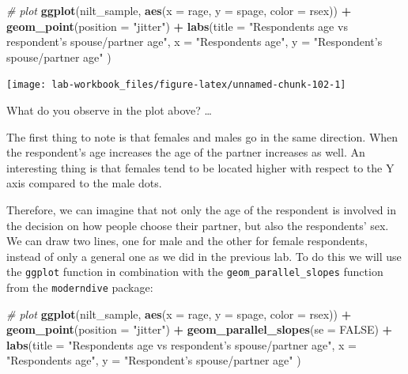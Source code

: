 \documentclass[
]{book}
\newenvironment{Shaded}{\begin{snugshade}}{\end{snugshade}}
\newcommand{\AttributeTok}[1]{\textcolor[rgb]{0.13,0.29,0.53}{#1}}
\newcommand{\CommentTok}[1]{\textcolor[rgb]{0.56,0.35,0.01}{\textit{#1}}}
\newcommand{\ConstantTok}[1]{\textcolor[rgb]{0.56,0.35,0.01}{#1}}
\newcommand{\FunctionTok}[1]{\textcolor[rgb]{0.13,0.29,0.53}{\textbf{#1}}}
\newcommand{\NormalTok}[1]{#1}
\newcommand{\SpecialCharTok}[1]{\textcolor[rgb]{0.81,0.36,0.00}{\textbf{#1}}}
\newcommand{\StringTok}[1]{\textcolor[rgb]{0.31,0.60,0.02}{#1}}
\begin{document}
\begin{Shaded}
\begin{Highlighting}[]
\CommentTok{\# plot}
\FunctionTok{ggplot}\NormalTok{(nilt\_sample,  }\FunctionTok{aes}\NormalTok{(}\AttributeTok{x =}\NormalTok{ rage, }\AttributeTok{y =}\NormalTok{ spage, }\AttributeTok{color =}\NormalTok{ rsex)) }\SpecialCharTok{+} 
  \FunctionTok{geom\_point}\NormalTok{(}\AttributeTok{position =} \StringTok{"jitter"}\NormalTok{) }\SpecialCharTok{+}
  \FunctionTok{labs}\NormalTok{(}\AttributeTok{title =} \StringTok{"Respondent\textquotesingle{}s age vs respondent’s spouse/partner age"}\NormalTok{, }
       \AttributeTok{x =} \StringTok{"Respondent\textquotesingle{}s age"}\NormalTok{, }\AttributeTok{y =} \StringTok{"Respondent’s spouse/partner age"}\NormalTok{ )}
\end{Highlighting}
\end{Shaded}

\begin{flushleft}\texttt{[image: lab-workbook\_files/figure-latex/unnamed-chunk-102-1]} \end{flushleft}

What do you observe in the plot above? \ldots{}

The first thing to note is that females and males go in the same direction. When the respondent's age increases the age of the partner increases as well. An interesting thing is that females tend to be located higher with respect to the Y axis compared to the male dots.

Therefore, we can imagine that not only the age of the respondent is involved in the decision on how people choose their partner, but also the respondents' sex. We can draw two lines, one for male and the other for female respondents, instead of only a general one as we did in the previous lab. To do this we will use the \texttt{ggplot} function in combination with the \texttt{geom\_parallel\_slopes} function from the \texttt{moderndive} package:

\begin{Shaded}
\begin{Highlighting}[]
\CommentTok{\# plot}
\FunctionTok{ggplot}\NormalTok{(nilt\_sample,  }\FunctionTok{aes}\NormalTok{(}\AttributeTok{x =}\NormalTok{ rage, }\AttributeTok{y =}\NormalTok{ spage, }\AttributeTok{color =}\NormalTok{ rsex)) }\SpecialCharTok{+} 
  \FunctionTok{geom\_point}\NormalTok{(}\AttributeTok{position =} \StringTok{"jitter"}\NormalTok{) }\SpecialCharTok{+}
  \FunctionTok{geom\_parallel\_slopes}\NormalTok{(}\AttributeTok{se =} \ConstantTok{FALSE}\NormalTok{) }\SpecialCharTok{+}
  \FunctionTok{labs}\NormalTok{(}\AttributeTok{title =} \StringTok{"Respondent\textquotesingle{}s age vs respondent’s spouse/partner age"}\NormalTok{, }
       \AttributeTok{x =} \StringTok{"Respondent\textquotesingle{}s age"}\NormalTok{, }\AttributeTok{y =} \StringTok{"Respondent’s spouse/partner age"}\NormalTok{ )}
\end{Highlighting}
\end{Shaded}
\end{document}
